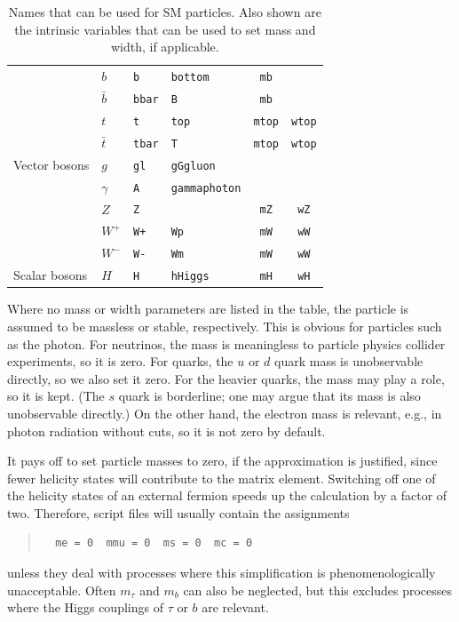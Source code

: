 \documentclass[12pt]{book}
\newcommand{\ttt}[1]{\texttt{#1}}
\begin{document}
\begin{table}[p]
\begin{center}
\begin{tabular}{|l|l|l|l|cc|}
      \hline
      &$b$ & \verb|b| & \ttt{bottom} & \ttt{mb} & \\
      &$\bar b$ & \verb|bbar| & \ttt{B} &  \ttt{mb} & \\
      \hline
      &$t$ & \verb|t| & \ttt{top} &  \ttt{mtop} & \ttt{wtop} \\
      &$\bar t$ & \verb|tbar| & \ttt{T} &  \ttt{mtop} & \ttt{wtop} \\
      \hline\hline
      Vector bosons
      &$g$ & \verb|gl| & \ttt{g}\quad\ttt{G}\quad\ttt{gluon} & & \\
      \hline
      &$\gamma$ & \verb|A| & \ttt{gamma}\quad\ttt{photon} & & \\
      \hline
      &$Z$ & \verb|Z| & & \ttt{mZ} & \ttt{wZ} \\
      \hline
      &$W^+$ & \verb|W+| & \ttt{Wp} & \ttt{mW} & \ttt{wW} \\
      &$W^-$ & \verb|W-| & \ttt{Wm} & \ttt{mW} & \ttt{wW} \\
      \hline\hline
      Scalar bosons
      &$H$ & \verb|H| & \ttt{h}\quad \ttt{Higgs} & \ttt{mH} & \ttt{wH} \\
      \hline
    \end{tabular}
  \end{center}
  \caption{\label{tab:SM-particles} Names that can be used for SM particles.
    Also shown are the intrinsic variables that can be used to set mass and
    width, if applicable.}
\end{table}

Where no mass or width parameters are listed in the table, the particle is
assumed to be massless or stable, respectively.  This is obvious for particles
such as the photon.  For neutrinos, the mass is meaningless to particle
physics collider experiments, so it is zero.  For quarks, the $u$ or
$d$ quark mass is unobservable directly, so we also set it zero.  For
the heavier quarks, the mass may play a role, so it is kept.  (The $s$
quark is borderline; one may argue that its mass is also unobservable
directly.)  On the other hand, the electron mass is relevant, e.g., in
photon radiation without cuts, so it is not zero by default.

It pays off to set particle masses to zero, if the approximation is justified,
since fewer helicity states will contribute to the matrix element.  Switching
off one of the helicity states of an external fermion speeds up the
calculation by a factor of two.  Therefore, script files will usually contain
the assignments
\begin{quote}
\begin{footnotesize}
\begin{verbatim}
  me = 0  mmu = 0  ms = 0  mc = 0
\end{verbatim}
\end{footnotesize}
\end{quote}
unless they deal with processes where this simplification is
phenomenologically unacceptable.  Often $m_\tau$ and $m_b$ can also be
neglected, but this excludes processes where the Higgs couplings of $\tau$ or
$b$ are relevant.
\end{document}
